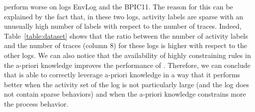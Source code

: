 \protrack perform worse on logs EnvLog and the BPIC11. The reason for this can be explained by the fact that, in these two logs, activity labels are sparse with an unusually high number of labels with respect to the number of traces. Indeed, Table~\ref{table:dataset} shows that the ratio between the number of activity labels and the number of traces (column 8) for these logs is higher with respect to the other logs.
We can also notice that the availability of highly constraining rules in the a-priori knowledge improves the performance of \protrack. Therefore, we can conclude that \protrack is able to correctly leverage a-priori knowledge in a way that it performs better when the activity set of the log is not particularly large (and the log does not contain sparse behaviors) and when the a-priori knowledge constrains more the process behavior.







